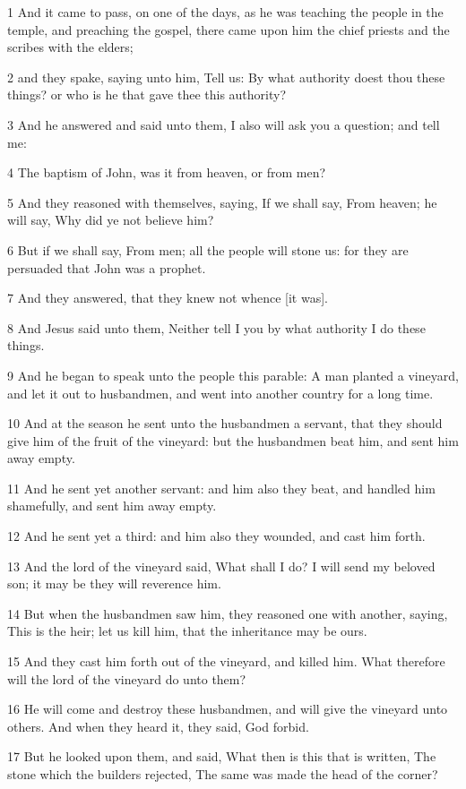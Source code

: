 \par 1 And it came to pass, on one of the days, as he was teaching the people in the temple, and preaching the gospel, there came upon him the chief priests and the scribes with the elders;
\par 2 and they spake, saying unto him, Tell us: By what authority doest thou these things? or who is he that gave thee this authority?
\par 3 And he answered and said unto them, I also will ask you a question; and tell me:
\par 4 The baptism of John, was it from heaven, or from men?
\par 5 And they reasoned with themselves, saying, If we shall say, From heaven; he will say, Why did ye not believe him?
\par 6 But if we shall say, From men; all the people will stone us: for they are persuaded that John was a prophet.
\par 7 And they answered, that they knew not whence [it was].
\par 8 And Jesus said unto them, Neither tell I you by what authority I do these things.
\par 9 And he began to speak unto the people this parable: A man planted a vineyard, and let it out to husbandmen, and went into another country for a long time.
\par 10 And at the season he sent unto the husbandmen a servant, that they should give him of the fruit of the vineyard: but the husbandmen beat him, and sent him away empty.
\par 11 And he sent yet another servant: and him also they beat, and handled him shamefully, and sent him away empty.
\par 12 And he sent yet a third: and him also they wounded, and cast him forth.
\par 13 And the lord of the vineyard said, What shall I do? I will send my beloved son; it may be they will reverence him.
\par 14 But when the husbandmen saw him, they reasoned one with another, saying, This is the heir; let us kill him, that the inheritance may be ours.
\par 15 And they cast him forth out of the vineyard, and killed him. What therefore will the lord of the vineyard do unto them?
\par 16 He will come and destroy these husbandmen, and will give the vineyard unto others. And when they heard it, they said, God forbid.
\par 17 But he looked upon them, and said, What then is this that is written, The stone which the builders rejected, The same was made the head of the corner?
